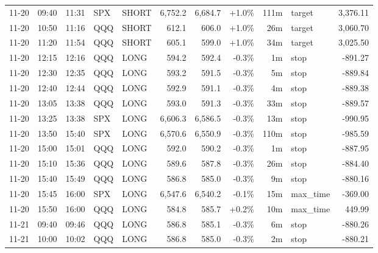\documentclass[11pt,a4paper,twoside]{article}
\begin{document}
\begin{center}
\begin{longtable}{>{\color{txtmain}}l l l l l r r r r >{\color{txtmain}}l r}
11-20 & 09:40 & 11:31 & SPX & SHORT & 6,752.2 & 6,684.7 & \textcolor{wingreen}{+1.0\%} & 111m & target & \textcolor{wingreen}{3,376.11} \\
11-20 & 10:50 & 11:16 & QQQ & SHORT & 612.1 & 606.0 & \textcolor{wingreen}{+1.0\%} & 26m & target & \textcolor{wingreen}{3,060.70} \\
11-20 & 11:20 & 11:54 & QQQ & SHORT & 605.1 & 599.0 & \textcolor{wingreen}{+1.0\%} & 34m & target & \textcolor{wingreen}{3,025.50} \\
11-20 & 12:15 & 12:16 & QQQ & LONG & 594.2 & 592.4 & \textcolor{lossred}{-0.3\%} & 1m & stop & \textcolor{lossred}{-891.27} \\
11-20 & 12:30 & 12:35 & QQQ & LONG & 593.2 & 591.5 & \textcolor{lossred}{-0.3\%} & 5m & stop & \textcolor{lossred}{-889.84} \\
11-20 & 12:40 & 12:44 & QQQ & LONG & 592.9 & 591.1 & \textcolor{lossred}{-0.3\%} & 4m & stop & \textcolor{lossred}{-889.38} \\
11-20 & 13:05 & 13:38 & QQQ & LONG & 593.0 & 591.3 & \textcolor{lossred}{-0.3\%} & 33m & stop & \textcolor{lossred}{-889.57} \\
11-20 & 13:25 & 13:38 & SPX & LONG & 6,606.3 & 6,586.5 & \textcolor{lossred}{-0.3\%} & 13m & stop & \textcolor{lossred}{-990.95} \\
11-20 & 13:50 & 15:40 & SPX & LONG & 6,570.6 & 6,550.9 & \textcolor{lossred}{-0.3\%} & 110m & stop & \textcolor{lossred}{-985.59} \\
11-20 & 15:00 & 15:01 & QQQ & LONG & 592.0 & 590.2 & \textcolor{lossred}{-0.3\%} & 1m & stop & \textcolor{lossred}{-887.95} \\
11-20 & 15:10 & 15:36 & QQQ & LONG & 589.6 & 587.8 & \textcolor{lossred}{-0.3\%} & 26m & stop & \textcolor{lossred}{-884.40} \\
11-20 & 15:40 & 15:49 & QQQ & LONG & 586.8 & 585.0 & \textcolor{lossred}{-0.3\%} & 9m & stop & \textcolor{lossred}{-880.16} \\
11-20 & 15:45 & 16:00 & SPX & LONG & 6,547.6 & 6,540.2 & \textcolor{lossred}{-0.1\%} & 15m & max\_time & \textcolor{lossred}{-369.00} \\
11-20 & 15:50 & 16:00 & QQQ & LONG & 584.8 & 585.7 & \textcolor{wingreen}{+0.2\%} & 10m & max\_time & \textcolor{wingreen}{449.99} \\
11-21 & 09:40 & 09:46 & QQQ & LONG & 586.8 & 585.1 & \textcolor{lossred}{-0.3\%} & 6m & stop & \textcolor{lossred}{-880.26} \\
11-21 & 10:00 & 10:02 & QQQ & LONG & 586.8 & 585.0 & \textcolor{lossred}{-0.3\%} & 2m & stop & \textcolor{lossred}{-880.21} \\

\end{longtable}
\end{center}
\end{document}
